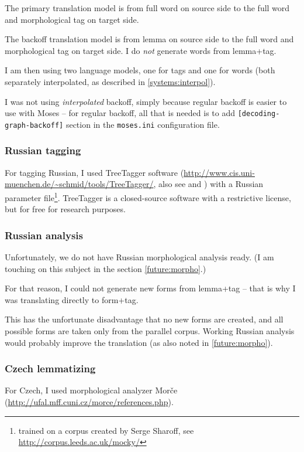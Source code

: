 The primary translation model is from full word on source side to the full word and morphological tag on target side. 

The backoff translation model is from lemma on source side to the full word and morphological tag on target side. I do \emph{not} generate words from lemma+tag.

I am then using two language models, one for tags and one for words (both separately interpolated, as described in \ref{systems:interpol}).

I was not using \emph{interpolated} backoff, simply because regular backoff is easier to use with Moses -- for regular backoff, all that is needed is to add \texttt{[decoding-graph-backoff]} section in the \texttt{moses.ini} configuration file.

\subsubsection{Russian tagging}
\label{experiments:treetagger}
For tagging Russian, I used TreeTagger software (\url{http://www.cis.uni-muenchen.de/~schmid/tools/TreeTagger/}, also see \cite{treetagger1} and \cite{treetagger2}) with a Russian parameter file\footnote{trained on a corpus created by Serge Sharoff, see \url{http://corpus.leeds.ac.uk/mocky/}}. TreeTagger is a closed-source software with a restrictive license, but for free for research purposes.
\subsubsection{Russian analysis}

Unfortunately, we do not have Russian morphological analysis ready. (I am touching on this subject in the section \ref{future:morpho}.)

For that reason, I could not generate new forms from lemma+tag -- that is why  I was translating directly to form+tag.

This has the unfortunate disadvantage that no new forms are created, and all possible forms are taken only from the parallel corpus. Working Russian analysis would probably improve the translation (as also noted in \ref{future:morpho}).

\subsubsection{Czech lemmatizing}

For Czech, I used morphological analyzer Morče (\url{http://ufal.mff.cuni.cz/morce/references.php}).
